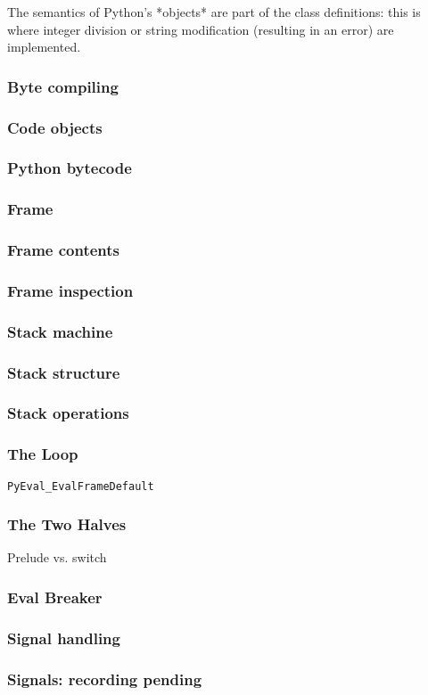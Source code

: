 The semantics of Python's
*objects*
are part of the class definitions:
this is where integer division
or string modification
(resulting in an error)
are implemented.

\begin{frame}
\frametitle{Byte compiling}
\end{frame}

\begin{frame}
\frametitle{Code objects}
\end{frame}

\begin{frame}
\frametitle{Python bytecode}
\end{frame}

\begin{frame}
\frametitle{Frame}
\end{frame}

\begin{frame}
\frametitle{Frame contents}
\end{frame}

\begin{frame}
\frametitle{Frame inspection}
\end{frame}

\begin{frame}
\frametitle{Stack machine}
\end{frame}

\begin{frame}
\frametitle{Stack structure}
\end{frame}

\begin{frame}
\frametitle{Stack operations}
\end{frame}

\begin{frame}[fragile]
\frametitle{The Loop}
\verb|PyEval_EvalFrameDefault|
\end{frame}

\begin{frame}
\frametitle{The Two Halves}
Prelude vs. switch
\end{frame}

\begin{frame}
\frametitle{Eval Breaker}
\end{frame}

\begin{frame}
\frametitle{Signal handling}
\end{frame}

\begin{frame}
\frametitle{Signals: recording pending}
\end{frame}

